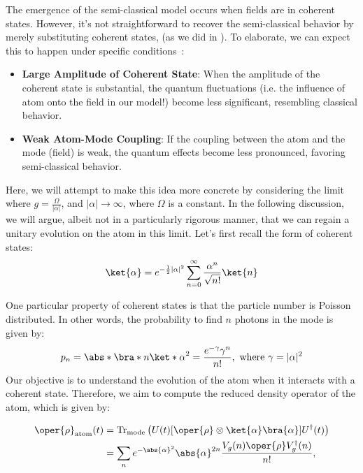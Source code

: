 The emergence of the semi-classical model occurs when fields are in
coherent states. However, it's not straightforward to recover the 
semi-classical behavior by merely substituting coherent states, (as we did in ). 
To elaborate, we can expect this to happen under specific conditions~\cite{semiclassical_limit_JC_PRL}:
\begin{itemize}
    \item \textbf{Large Amplitude of Coherent State}: When the amplitude of the coherent state is substantial, 
    the quantum fluctuations (i.e. the influence of atom onto the field in our model!) become less significant, 
    resembling classical behavior.
    \item \textbf{Weak Atom-Mode Coupling}: If the coupling between the atom and the mode (field) is weak, 
    the quantum effects become less pronounced, favoring semi-classical behavior.
\end{itemize}
Here, we will attempt to make this idea more concrete by considering the 
limit where $g = \frac{\Omega}{|\alpha|}$, and $|\alpha| \rightarrow \infty$, where 
$\Omega$ is a constant. In the following discussion, we will argue, albeit not in a particularly rigorous manner, that we can regain a unitary evolution on the atom in this limit. Let's first recall the form of coherent states:
\begin{equation}
    \ket{\alpha} = e^{-\frac{1}{2}|\alpha|^2} \sum_{n=0}^{\infty} \frac{\alpha^n}{\sqrt{n!}} \ket{n}
\end{equation}
    
One particular property of coherent states is that the particle number is Poisson distributed. In other words, the probability to find $n$ photons in the mode is given by:
\begin{equation}
    p_n = \abs*{\bra*{n}\ket*{\alpha}}^2 = \frac{e^{-\gamma} \gamma^n}{n!}, \text{ where } \gamma = |\alpha|^2
\end{equation}
Our objective is to understand the evolution of the atom when it interacts with a coherent state. 
Therefore, we aim to compute the reduced density operator of the atom, which is given by:

\begin{align}
\oper{\rho}_{\text{atom}}(t) &= 
\text{Tr}_{\text{mode}} \left( U(t)[\oper{\rho} \otimes \ket{\alpha}\bra{\alpha}]U^\dagger(t) \right) \nonumber \\
 &= \sum_n e^{-\abs{\alpha}^2} \abs{\alpha}^{2n} \frac{V_g(n)\oper{\rho} V_g^\dagger(n)}{n!},
\end{align}

